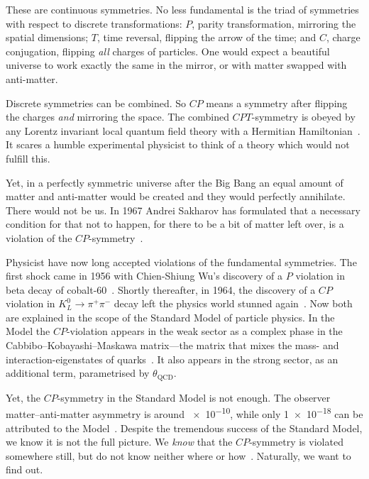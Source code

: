These are continuous symmetries. No less fundamental is the triad of symmetries with respect to discrete transformations: $P$, parity transformation, mirroring the spatial dimensions; $T$, time reversal, flipping the arrow of the time; and $C$, charge conjugation, flipping \emph{all} charges of particles. One would expect a beautiful universe to work exactly the same in the mirror, or with matter swapped with anti-matter.

Discrete symmetries can be combined. So $CP$ means a symmetry after flipping the charges \emph{and} mirroring the space. The combined $CPT$-symmetry is obeyed by any Lorentz invariant local quantum field theory with a Hermitian Hamiltonian~\cite{Sachs1987}. It scares a humble experimental physicist to think of a theory which would not fulfill this.

Yet, in a perfectly symmetric universe after the Big Bang an equal amount of matter and anti-matter would be created and they would perfectly annihilate. There would not be us.
In 1967 Andrei Sakharov
has formulated that a necessary condition for that not to happen, for there to be a bit of matter left over, is a violation of the $CP$-symmetry~\cite{0038-5670-34-5-A08}.

Physicist have now long accepted violations of the fundamental symmetries.
The first shock came in 1956 with Chien-Shiung Wu's discovery of a $P$ violation in beta decay of cobalt-60~\cite{PhysRev.105.1413}. Shortly thereafter, in 1964, the discovery of a $CP$ violation in $K^0_L \rightarrow \pi^+ \pi^-$ decay left the physics world stunned again~\cite{PhysRevLett.13.138}. Now both are explained in the scope of the Standard Model of particle physics. In the Model the $CP$-violation appears in the weak sector as a complex phase in the Cabbibo--Kobayashi--Maskawa matrix---the matrix that mixes the mass- and interaction-eigenstates of quarks~\cite{doi:10.1143/PTP.49.652}. It also appears in the strong sector, as an additional term, parametrised by $\theta_\text{QCD}$. 

Yet, the $CP$-symmetry in the Standard Model is not enough. The observer matter--anti-matter asymmetry is around \num{e-10}, while only \num{1e-18} can be attributed to the Model~\cite{Riotto1999}. Despite the tremendous success of the Standard Model, we know it is not the full picture. We \emph{know} that the $CP$-symmetry is violated somewhere still, but do not know neither where or how~\cite{Pospelov2005}. Naturally, we want to find out. 

